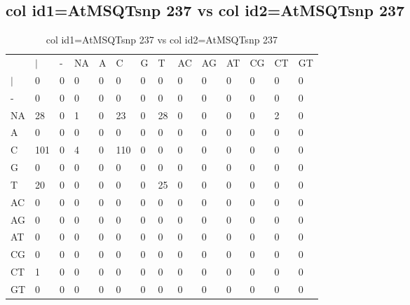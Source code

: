 \subsection{col id1=AtMSQTsnp 237 vs col id2=AtMSQTsnp 237}
\begin{center}
\begin{longtable}{|l|l|l|l|l|l|l|l|l|l|l|l|l|l|}
\caption{col id1=AtMSQTsnp 237 vs col id2=AtMSQTsnp 237} \label{table_dm796}\\
\hline
\\
\hline
&$|$&-&NA&A&C&G&T&AC&AG&AT&CG&CT&GT\\
$|$&0&0&0&0&0&0&0&0&0&0&0&0&0\\
-&0&0&0&0&0&0&0&0&0&0&0&0&0\\
NA&28&0&1&0&23&0&28&0&0&0&0&2&0\\
A&0&0&0&0&0&0&0&0&0&0&0&0&0\\
C&101&0&4&0&110&0&0&0&0&0&0&0&0\\
G&0&0&0&0&0&0&0&0&0&0&0&0&0\\
T&20&0&0&0&0&0&25&0&0&0&0&0&0\\
AC&0&0&0&0&0&0&0&0&0&0&0&0&0\\
AG&0&0&0&0&0&0&0&0&0&0&0&0&0\\
AT&0&0&0&0&0&0&0&0&0&0&0&0&0\\
CG&0&0&0&0&0&0&0&0&0&0&0&0&0\\
CT&1&0&0&0&0&0&0&0&0&0&0&0&0\\
GT&0&0&0&0&0&0&0&0&0&0&0&0&0\\
\hline
\end{longtable}
\end{center}

